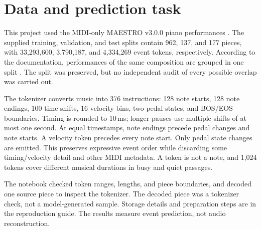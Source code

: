 \section{Data and prediction task}
\label{sec:data}
This project used the MIDI-only MAESTRO v3.0.0 piano performances \citep{hawthorne2019maestro}. The supplied training, validation, and test splits contain 962, 137, and 177 pieces, with 33,293,600, 3,790,187, and 4,334,269 event tokens, respectively. According to the documentation, performances of the same composition are grouped in one split \citep{maestrodata}. The split was preserved, but no independent audit of every possible overlap was carried out.

The tokenizer converts music into 376 instructions: 128 note starts, 128 note endings, 100 time shifts, 16 velocity bins, two pedal states, and BOS/EOS boundaries. Timing is rounded to 10\,ms; longer pauses use multiple shifts of at most one second. At equal timestamps, note endings precede pedal changes and note starts. A velocity token precedes every note start. Only pedal state changes are emitted. This preserves expressive event order while discarding some timing/velocity detail and other MIDI metadata. A token is not a note, and 1,024 tokens cover different musical durations in busy and quiet passages.

The notebook checked token ranges, lengths, and piece boundaries, and decoded one source piece to inspect the tokenizer. The decoded piece was a tokenizer check, not a model-generated sample. Storage details and preparation steps are in the reproduction guide. The results measure event prediction, not audio reconstruction.
